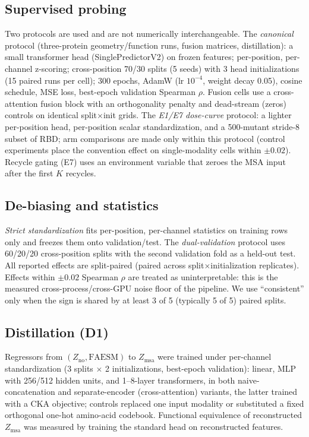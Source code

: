 \documentclass[11pt]{article}
\newcommand{\Zmsa}{\ensuremath{Z_{\mathrm{msa}}}}
\newcommand{\Zno}{\ensuremath{Z_{\mathrm{no}}}}
\begin{document}
\subsection{Supervised probing}

Two protocols are used and are not numerically interchangeable. The
\emph{canonical} protocol (three-protein geometry/function runs, fusion
matrices, distillation): a small transformer head (SinglePredictorV2) on
frozen features; per-position, per-channel z-scoring; cross-position 70/30
splits (5 seeds) with 3 head initializations (15 paired runs per cell); 300
epochs, AdamW (lr $10^{-4}$, weight decay 0.05), cosine schedule, MSE loss,
best-epoch validation Spearman $\rho$. Fusion cells use a cross-attention
fusion block with an orthogonality penalty and dead-stream (zeros) controls on
identical split$\times$init grids. The \emph{E1/E7 dose-curve} protocol:
a lighter per-position head, per-position scalar standardization, and a
500-mutant stride-8 subset of RBD; arm comparisons are made only within this
protocol (control experiments place the convention effect on single-modality
cells within $\pm0.02$). Recycle gating (E7) uses an environment variable that
zeroes the MSA input after the first $K$ recycles.

\subsection{De-biasing and statistics}

\emph{Strict standardization} fits per-position, per-channel statistics on
training rows only and freezes them onto validation/test. The
\emph{dual-validation} protocol uses 60/20/20 cross-position splits with the
second validation fold as a held-out test. All reported effects are
split-paired (paired across split$\times$initialization replicates). Effects
within $\pm0.02$ Spearman $\rho$ are treated as uninterpretable: this is the
measured cross-process/cross-GPU noise floor of the pipeline. We use
``consistent'' only when the sign is shared by at least 3 of 5 (typically 5 of
5) paired splits.

\subsection{Distillation (D1)}

Regressors from $(\Zno{}, \mathrm{FAESM})$ to \Zmsa{} were trained under
per-channel standardization (3 splits $\times$ 2 initializations, best-epoch
validation): linear, MLP with 256/512 hidden units, and 1--8-layer
transformers, in both naive-concatenation and separate-encoder (cross-attention)
variants, the latter trained with a CKA objective; controls replaced one input
modality or substituted a fixed orthogonal one-hot amino-acid codebook.
Functional equivalence of reconstructed \Zmsa{} was measured by training the
standard head on reconstructed features.
\end{document}
